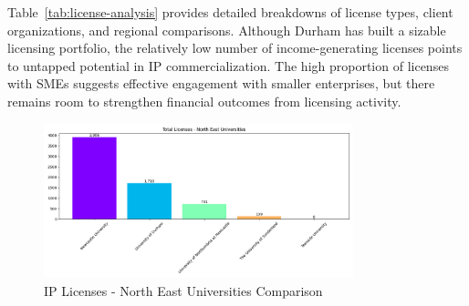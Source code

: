 \documentclass[journal,onecolumn, 10pt,draftclsnofoot]{IEEEtran}
\begin{document}
Table~\ref{tab:license-analysis} provides detailed breakdowns of license types, client organizations, and regional comparisons. Although Durham has built a sizable licensing portfolio, the relatively low number of income-generating licenses points to untapped potential in IP commercialization. The high proportion of licenses with SMEs suggests effective engagement with smaller enterprises, but there remains room to strengthen financial outcomes from licensing activity.
\vspace{0.2cm}
\begin{table}[h]
\centering
\caption{IP License Analysis - Durham University}
\vspace{0.1cm}
\label{tab:license-analysis}
\end{table}

\begin{figure}[h]
\centering
\includegraphics[width=0.8\textwidth]{Fig/figure23.license_ne_comparison.png}
\caption{IP Licenses - North East Universities Comparison}
\label{fig:license-ne-comparison}
\end{figure}
\end{document}
